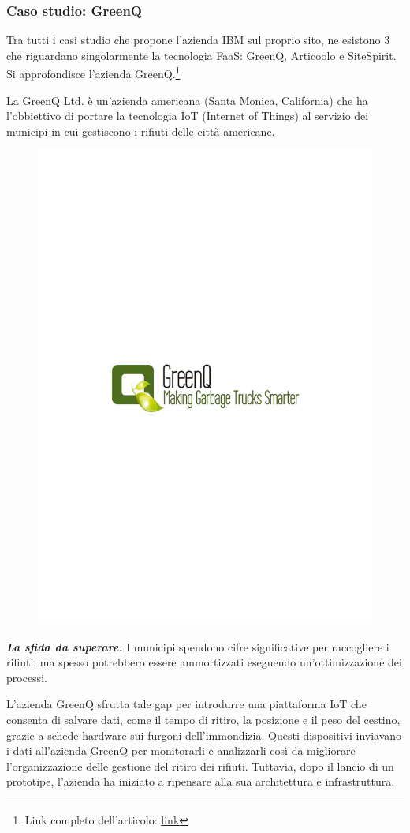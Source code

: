 \documentclass[a4paper]{article}
\begin{document}
	\subsubsection{Caso studio: GreenQ}
	
	Tra tutti i casi studio che propone l'azienda IBM sul proprio sito, ne esistono 3 che riguardano singolarmente la tecnologia FaaS: GreenQ, Articoolo e SiteSpirit. Si approfondisce l'azienda GreenQ.\footnote{Link completo dell'articolo: \href{https://www.ibm.com/case-studies/greenq-ltd}{link}}\newline
	
	\noindent
	La GreenQ Ltd. è un'azienda americana (Santa Monica, California) che ha l'obbiettivo di portare la tecnologia IoT (Internet of Things) al servizio dei municipi in cui gestiscono i rifiuti delle città americane.
	
	\begin{figure}[!htp]
		\centering
		\includegraphics[width=.5\textwidth]{img/GreenQ-logo.pdf}
	\end{figure}
	
	\noindent
	\textbf{\emph{La sfida da superare.}} I municipi spendono cifre significative per raccogliere i rifiuti, ma spesso potrebbero essere ammortizzati eseguendo un'ottimizzazione dei processi.
	
	L'azienda GreenQ sfrutta tale gap per introdurre una piattaforma IoT che consenta di salvare dati, come il tempo di ritiro, la posizione e il peso del cestino, grazie a schede hardware sui furgoni dell'immondizia. Questi dispositivi inviavano i dati all'azienda GreenQ per monitorarli e analizzarli così da migliorare l'organizzazione delle gestione del ritiro dei rifiuti. Tuttavia, dopo il lancio di un prototipe, l'azienda ha iniziato a ripensare alla sua architettura e infrastruttura.
	
\end{document}
